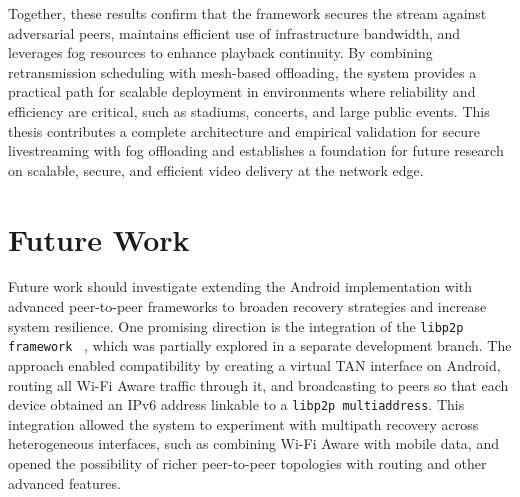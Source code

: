 \quad Together, these results confirm that the framework secures the stream against adversarial peers, maintains efficient use of infrastructure bandwidth, and leverages fog resources to enhance playback continuity. By combining retransmission scheduling with mesh-based offloading, the system provides a practical path for scalable deployment in environments where reliability and efficiency are critical, such as stadiums, concerts, and large public events. This thesis contributes a complete architecture and empirical validation for secure livestreaming with fog offloading and establishes a foundation for future research on scalable, secure, and efficient video delivery at the network edge.


\section{Future Work}
\label{sec:future work}

\quad Future work should investigate extending the Android implementation with advanced peer-to-peer frameworks to broaden recovery strategies and increase system resilience. One promising direction is the integration of the \texttt{libp2p framework} ~\cite{libp2p}, which was partially explored in a separate development branch. The approach enabled compatibility by creating a virtual TAN interface on Android, routing all Wi-Fi Aware traffic through it, and broadcasting to peers so that each device obtained an IPv6 address linkable to a \texttt{libp2p multiaddress}. This integration allowed the system to experiment with multipath recovery across heterogeneous interfaces, such as combining Wi-Fi Aware with mobile data, and opened the possibility of richer peer-to-peer topologies with routing and other advanced features.  

